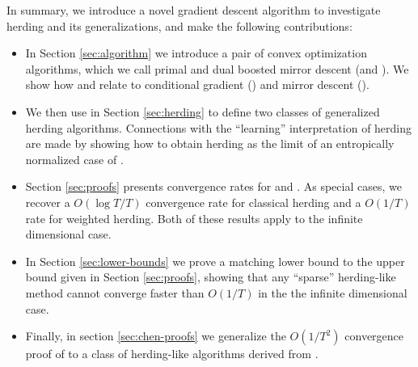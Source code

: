 \documentclass[paper.tex]{subfiles}
\begin{document}
In summary, we introduce a novel gradient descent algorithm to investigate herding and its generalizations, and make the following contributions:
\begin{itemize}
\item In Section \ref{sec:algorithm} we introduce a pair of convex optimization algorithms, which we call primal and dual boosted mirror descent (\primal and \dual). We show how \primal and \dual relate to conditional gradient (\cgd) and mirror descent (\md). 
\item We then use \dual in Section \ref{sec:herding} to define two classes of generalized herding algorithms. Connections with the ``learning'' interpretation of herding are made by showing how to obtain herding as the limit of an entropically normalized case of \dual. 
\item Section \ref{sec:proofs} presents convergence rates for \primal and \dual. As special cases, we recover a $O(\log T/ T)$ convergence rate for classical herding and a $O(1/T)$ rate for weighted herding. Both of these results apply to the infinite dimensional case. 
\item In Section \ref{sec:lower-bounds} we prove a matching lower bound to the upper bound given in Section \ref{sec:proofs}, showing that any ``sparse'' herding-like method cannot converge faster than $O(1/T)$ in the the infinite dimensional case.%
\item Finally, in section \ref{sec:chen-proofs} we generalize the $O(1/T^{2})$ convergence proof of \citet{Chen:2010a} to a class of herding-like algorithms derived from \bmd. 
\end{itemize}
\end{document}
